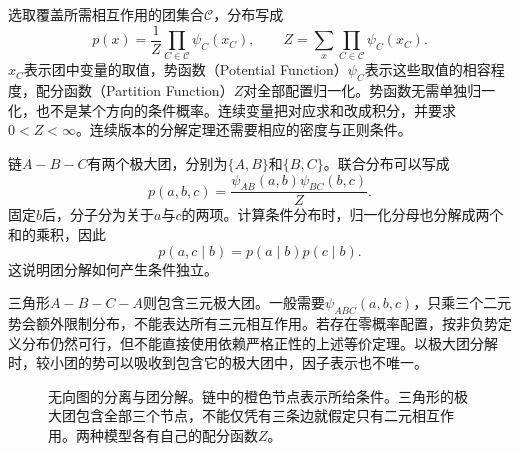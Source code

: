 选取覆盖所需相互作用的团集合$\mathcal C$，分布写成
\begin{equation}
 p(x)=\frac{1}{Z}\prod_{C\in\mathcal C}\psi_C(x_C),\qquad
 Z=\sum_x\prod_{C\in\mathcal C}\psi_C(x_C).
 \label{eq:bayes-undirected-factorization}
\end{equation}
$x_C$表示团中变量的取值，势函数（Potential Function）$\psi_C$表示这些取值的相容程度，配分函数（Partition Function）$Z$对全部配置归一化。势函数无需单独归一化，也不是某个方向的条件概率。连续变量把对应求和改成积分，并要求$0<Z<\infty$。连续版本的分解定理还需要相应的密度与正则条件。

链$A-B-C$有两个极大团，分别为$\{A,B\}$和$\{B,C\}$。联合分布可以写成
\[
 p(a,b,c)=\frac{\psi_{AB}(a,b)\psi_{BC}(b,c)}{Z}.
\]
固定$b$后，分子分为关于$a$与$c$的两项。计算条件分布时，归一化分母也分解成两个和的乘积，因此
\[
 p(a,c\mid b)=p(a\mid b)p(c\mid b).
\]
这说明团分解如何产生条件独立。

三角形$A-B-C-A$则包含三元极大团。一般需要$\psi_{ABC}(a,b,c)$，只乘三个二元势会额外限制分布，不能表达所有三元相互作用。若存在零概率配置，按非负势定义分布仍然可行，但不能直接使用依赖严格正性的上述等价定理。以极大团分解时，较小团的势可以吸收到包含它的极大团中，因子表示也不唯一。

\begin{figure}[htbp]
\centering
{}
\caption{无向图的分离与团分解。链中的橙色节点表示所给条件。三角形的极大团包含全部三个节点，不能仅凭有三条边就假定只有二元相互作用。两种模型各有自己的配分函数$Z$。}
\label{fig:bayes-clique-factorization}
\end{figure}

